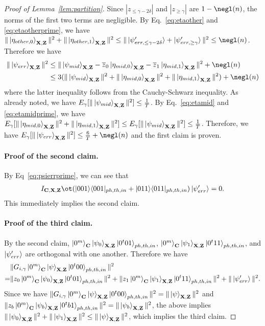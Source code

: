 \begin{proof}[Proof of Lemma~\ref{lem:partition}]
Since $|z_{\leq \gamma-2\delta}|$ and $|z_{\geq \gamma}|$ are $1-\negl(\secpar)$, the norms of the first two terms are negligible.
By Eq.~\ref{eq:etaother} and \ref{eq:etaotherprime}, we have $\|\ket{\eta_{other,0}}_{\regX,\regZ}\|^2 + \|\ket{\eta_{other,1}}_{\regX,\regZ}\|^2\leq \|\ket{\psi'_{err,\leq \gamma-2\delta}}+\ket{\psi'_{err,\geq \gamma}}\|^2 \leq \negl(\secpar)$.
Therefore we have
\begin{align*}
\|\ket{\psi_{err}}_{\regX,\regZ}\|^2 &\leq \|\ket{\psi_{mid}}_{\regX,\regZ}-\overline{z}_0\ket{\eta_{mid,0}}_{\regX,\regZ}-\overline{z}_1\ket{\eta_{mid,1}}_{\regX,\regZ}\|^2+\negl(\secpar)\\
&\leq 3(\|\ket{\psi_{mid}}_{\regX,\regZ}\|^2+\|\ket{\eta_{mid,0}}_{\regX,\regZ}\|^2 + \|\ket{\eta_{mid,1}}_{\regX,\regZ}\|^2)+\negl(\secpar)
\end{align*}
where the latter inequality follows from the Cauchy-Schwarz inequality.
As already noted, we have $E_{\gamma}[\|\ket{\psi_{mid}}_{\mathbf{X},\mathbf{Z}}\|^2]\leq \frac{1}{T}$.
By Eq.~\ref{eq:etamid} and \ref{eq:etamidprime}, we have $E_{\gamma}[\|\ket{\eta_{mid,0}}_{\mathbf{X},\mathbf{Z}}\|^2 + \|\ket{\eta_{mid,1}}_{\mathbf{X},\mathbf{Z}}\|^2]\leq E_{\gamma}[\|\ket{\psi_{mid}}_{\mathbf{X},\mathbf{Z}}\|^2]\leq \frac{1}{T}$.
Therefore, we have $E_{\gamma}[\|\ket{\psi_{err}}_{\regX,\regZ}\|^2]\leq \frac{6}{T}+\negl(\secpar)$ and the first claim is proven.

\paragraph{Proof of the second claim.}
By Eq~\ref{eq:psierrprime}, we can see that 
\begin{align*}
I_{\regC,\regX,\regZ} \ot (\opro{001}{001}_{ph,th,in}+ \opro{011}{011}_{ph,th,in})\ket{\psi'_{err}}=0.
\end{align*}
This immediately implies the second claim.
%
\paragraph{Proof of the third claim.}
By the second claim,  $\ket{0^m}_{\mathbf{C}}\ket{\psi_{0}}_{\mathbf{X},\mathbf{Z}}\ket{0^t01}_{ph,th,in}$,  $\ket{0^m}_{\mathbf{C}}\ket{\psi_{1}}_{\mathbf{X},\mathbf{Z}}\ket{0^t11}_{ph,th,in}$, and $\ket{\psi'_{err}}$ are orthogonal with one another.
Therefore we have 
\begin{align*}
&\|G_{i,\gamma}\ket{0^m}_{\mathbf{C}}\ket{\psi}_{\mathbf{X},\mathbf{Z}}\ket{0^t00}_{ph,th,in}\|^2\\
=&\|z_0\ket{0^m}_{\mathbf{C}}\ket{\psi_{0}}_{\mathbf{X},\mathbf{Z}}\ket{0^t01}_{ph,th,in}\|^2+\|z_1\ket{0^m}_{\mathbf{C}}\ket{\psi_{1}}_{\mathbf{X},\mathbf{Z}}\ket{0^t11}_{ph,th,in}\|^2+\|\ket{\psi'_{err}}\|^2.
\end{align*}
Since we have 
$\|G_{i,\gamma}\ket{0^m}_{\mathbf{C}}\ket{\psi}_{\mathbf{X},\mathbf{Z}}\ket{0^t00}_{ph,th,in}\|^2=\|\ket{\psi}_{\mathbf{X},\mathbf{Z}}\|^2$ and $\|z_b\ket{0^m}_{\mathbf{C}}\ket{\psi_{b}}_{\mathbf{X},\mathbf{Z}}\ket{0^tb1}_{ph,th,in}\|^2=\|\ket{\psi_{b}}_{\mathbf{X},\mathbf{Z}}\|^2$, the above implies $\|\ket{\psi_{0}}_{\mathbf{X},\mathbf{Z}}\|^2+\|\ket{\psi_{1}}_{\mathbf{X},\mathbf{Z}}\|^2\leq \|\ket{\psi}_{\mathbf{X},\mathbf{Z}}\|^2$, which implies the third claim.
%

\end{proof}
